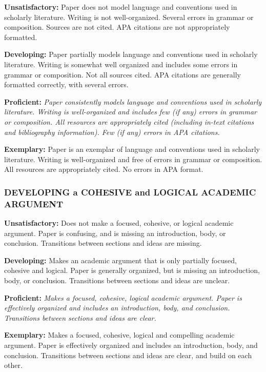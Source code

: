 \documentclass[
]{book}
\begin{document}
\textbf{Unsatisfactory:} Paper does not model language and conventions used in scholarly literature. Writing is not well-organized. Several errors in grammar or composition. Sources are not cited. APA citations are not appropriately formatted.

\textbf{Developing:} Paper partially models language and conventions used in scholarly literature. Writing is somewhat well organized and includes some errors in grammar or composition. Not all sources cited. APA citations are generally formatted correctly, with several errors.

\textbf{Proficient:} \emph{Paper consistently models language and conventions used in scholarly literature. Writing is well-organized and includes few (if any) errors in grammar or composition. All resources are appropriately cited (including in-text citations and bibliography information). Few (if any) errors in APA citations.}

\textbf{Exemplary:} Paper is an exemplar of language and conventions used in scholarly literature. Writing is well-organized and free of errors in grammar or composition. All resources are appropriately cited. No errors in APA format.

\hypertarget{developing-a-cohesive-and-logical-academic-argument-2}{%
\subsubsection*{DEVELOPING a COHESIVE and LOGICAL ACADEMIC ARGUMENT}\label{developing-a-cohesive-and-logical-academic-argument-2}}

\textbf{Unsatisfactory:} Does not make a focused, cohesive, or logical academic argument. Paper is confusing, and is missing an introduction, body, or conclusion. Transitions between sections and ideas are missing.

\textbf{Developing:} Makes an academic argument that is only partially focused, cohesive and logical. Paper is generally organized, but is missing an introduction, body, or conclusion. Transitions between sections and ideas are unclear.

\textbf{Proficient:} \emph{Makes a focused, cohesive, logical academic argument. Paper is effectively organized and includes an introduction, body, and conclusion. Transitions between sections and ideas are clear.}

\textbf{Exemplary:} Makes a focused, cohesive, logical and compelling academic argument. Paper is effectively organized and includes an introduction, body, and conclusion. Transitions between sections and ideas are clear, and build on each other.
\end{document}
